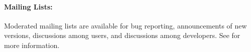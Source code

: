 \paragraph{Mailing Lists:}

Moderated mailing lists are available for bug reporting, announcements
of new versions, discussions among users, and discussions among
developers.  See
 for more
information.

\endinput

